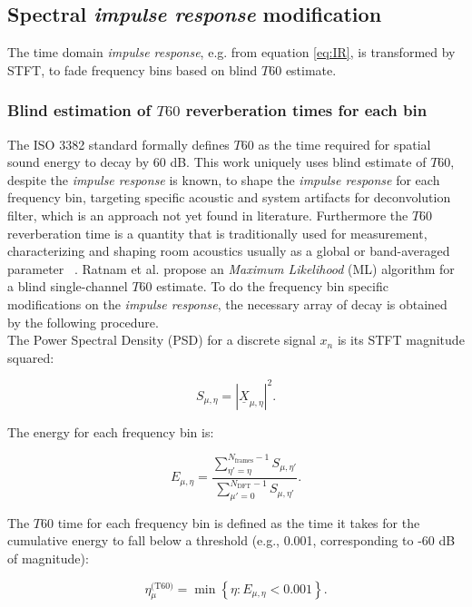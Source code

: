 \documentclass{article}
\begin{document}
\subsection{Spectral \textit{impulse response} modification}
The time domain \textit{impulse response}, e.g. from equation \eqref{eq:IR}, is transformed by STFT, to fade frequency bins based on blind $T60$ estimate. 


\subsubsection{Blind estimation of $T60$ reverberation times for each bin}
The ISO 3382 standard \cite{iso3382} formally defines $T60$ as the time required for spatial sound energy to decay by 60 dB. 
This work uniquely uses blind estimate of $T60$, despite the \textit{impulse response} is known, to shape the \textit{impulse response} for each frequency bin, targeting specific acoustic and system artifacts for deconvolution filter, which is an approach not yet found in literature. Furthermore the $T60$ reverberation time is a quantity that is traditionally used for measurement, characterizing and shaping room acoustics usually as a global or band-averaged parameter ~\cite{kuttruff2016}.
Ratnam et al. propose an \textit{Maximum Likelihood} (ML) algorithm for a blind single-channel $T60$ estimate\cite{ratnam2003}.
To do the frequency bin specific modifications on the \textit{impulse response}, the necessary array of decay is obtained by the following procedure.
\\
The Power Spectral Density (PSD) for a discrete signal $x_n$ is its STFT magnitude squared:

\begin{equation}
S_{\mu, \eta} = |\underline{X}_{\mu, \eta}|^2 \label{eq:PSD}.
\end{equation}

The energy for each frequency bin is: %

\begin{equation}
E_{\mu, \eta} = \frac{\sum_{\eta' = \eta}^{N_{\text{frames}}-1} S_{\mu, \eta'}}{\sum_{\mu' = 0}^{N_{\text{DFT}}-1} S_{\mu, \eta'}}.
\end{equation}

The $T60$ time for each frequency bin is defined as the time it takes for the cumulative energy to fall below a threshold (e.g., 0.001, corresponding to -60 dB of magnitude):

\begin{equation}
\eta^{\text{(T60)}}_{\mu} = \min \left\{ \eta : E_{\mu, \eta} < 0.001 \right\}.
\end{equation}
\end{document}
